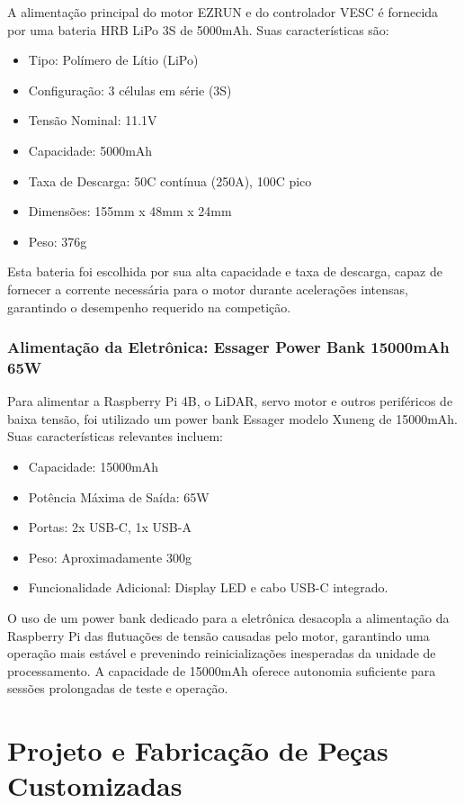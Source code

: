 A alimentação principal do motor EZRUN e do controlador VESC é fornecida por
uma bateria HRB LiPo 3S de 5000mAh. Suas características são:
\begin{itemize}
      \item Tipo: Polímero de Lítio (LiPo)
      \item Configuração: 3 células em série (3S)
      \item Tensão Nominal: 11.1V
      \item Capacidade: 5000mAh
      \item Taxa de Descarga: 50C contínua (250A), 100C pico
      \item Dimensões: 155mm x 48mm x 24mm
      \item Peso: 376g
\end{itemize}
Esta bateria foi escolhida por sua alta capacidade e taxa de descarga, capaz de
fornecer a corrente necessária para o motor durante acelerações intensas,
garantindo o desempenho requerido na competição.

\subsubsection{Alimentação da Eletrônica: Essager Power Bank 15000mAh 65W}

Para alimentar a Raspberry Pi 4B, o LiDAR, servo motor e outros periféricos de
baixa tensão, foi utilizado um power bank Essager modelo Xuneng de 15000mAh.
Suas características relevantes incluem:
\begin{itemize}
      \item Capacidade: 15000mAh
      \item Potência Máxima de Saída: 65W
      \item Portas: 2x USB-C, 1x USB-A
      \item Peso: Aproximadamente 300g
      \item Funcionalidade Adicional: Display LED e cabo USB-C integrado.
\end{itemize}
O uso de um power bank dedicado para a eletrônica desacopla a alimentação da
Raspberry Pi das flutuações de tensão causadas pelo motor, garantindo uma
operação mais estável e prevenindo reinicializações inesperadas da unidade de
processamento. A capacidade de 15000mAh oferece autonomia suficiente para
sessões prolongadas de teste e operação.

\section{Projeto e Fabricação de Peças Customizadas}

